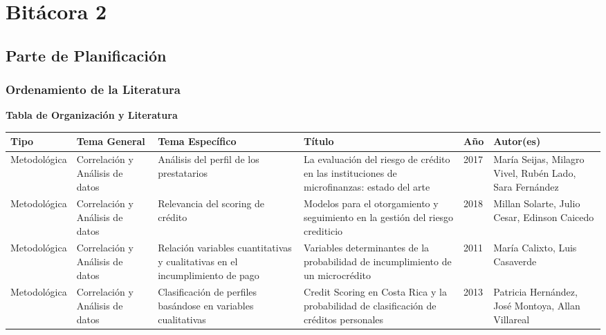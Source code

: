 \documentclass[
  letterpaper,
  DIV=11,
  numbers=noendperiod]{scrreprt}
\begin{document}
\chapter{Bitácora 2}\label{bituxe1cora-2}

\section{Parte de Planificación}\label{parte-de-planificaciuxf3n-1}

\subsection{Ordenamiento de la
Literatura}\label{ordenamiento-de-la-literatura}

\textbf{Tabla de Organización y Literatura}

\begin{longtable*}{| p{2.5cm} | p{2cm} | p{2.5cm} | p{3cm} | p{0.8cm} | p{2.5cm} |}
\hline
\textbf{Tipo} & \textbf{Tema General} & \textbf{Tema Específico} & \textbf{Título} & \textbf{Año} & \textbf{Autor(es)} \\
\hline
\fontsize{8pt}{10pt}
Metodológica & Correlación y Análisis de datos & Análisis del perfil de los prestatarios & La evaluación del riesgo de crédito en las instituciones de microfinanzas: estado del arte & 2017 & María Seijas, Milagro Vivel, Rubén Lado, Sara Fernández \\
\hline
Metodológica & Correlación y Análisis de datos & Relevancia del scoring de crédito & Modelos para el otorgamiento y seguimiento en la gestión del riesgo crediticio & 2018 & Millan Solarte, Julio Cesar, Edinson Caicedo \\
\hline
Metodológica & Correlación y Análisis de datos & Relación variables cuantitativas y cualitativas en el incumplimiento de pago & Variables determinantes de la probabilidad de incumplimiento de un microcrédito & 2011 & María Calixto, Luis Casaverde \\
\hline
Metodológica & Correlación y Análisis de datos & Clasificación de perfiles basándose en variables cualitativas & Credit Scoring en Costa Rica y la probabilidad de clasificación de créditos personales & 2013 & Patricia Hernández, José Montoya, Allan Villareal \\
\hline
\end{longtable*}

\normalsize
\newpage
\end{document}
